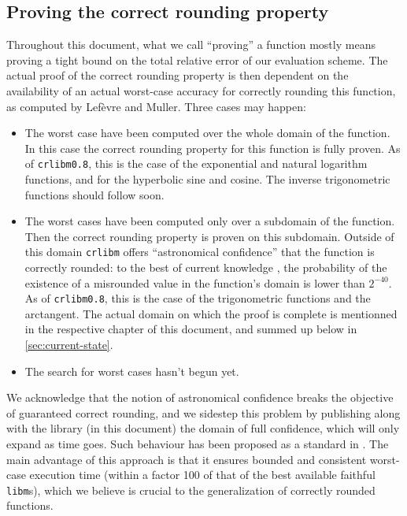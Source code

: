 \subsection{Proving the correct rounding property}

Throughout this document, what we call ``proving'' a function mostly
means proving a tight bound on the total relative error of our
evaluation scheme. The actual proof of the correct rounding property
is then dependent on the availability of an actual worst-case accuracy
for correctly rounding this function, as computed by Lef\`evre and
Muller. Three cases may happen:
\begin{itemize}
\item The worst case have been computed over the whole domain of the
  function. In this case the correct rounding property for this
  function is fully proven. As of \texttt{crlibm0.8}, this is the case
  of the exponential and natural logarithm functions, and for the
  hyperbolic sine and cosine. The inverse trigonometric functions
  should follow soon.

\item The worst cases have been computed only over a subdomain of the
  function. Then the correct rounding property is proven on this
  subdomain. Outside of this domain \texttt{crlibm} offers
  ``astronomical confidence'' that the function is correctly rounded:
  to the best of current knowledge \cite{Gal86, DinGast2005}, the
  probability of the existence of a misrounded value in the function's
  domain is lower than $2^{-40}$. As of \texttt{crlibm0.8}, this is
  the case of the trigonometric functions and the arctangent. The
  actual domain on which the proof is complete is mentionned in the
  respective chapter of this document, and summed up below in \ref{sec:current-state}.
\item The search for worst cases hasn't begun yet.
\end{itemize}

We acknowledge that the notion of astronomical confidence breaks the
objective of guaranteed correct rounding, and we sidestep this problem
by publishing along with the library (in this document) the domain of
full confidence, which will only expand as time goes.  Such behaviour
has been proposed as a standard in \cite{DefHanLefMulRevZim2004}.  The
main advantage of this approach is that it ensures bounded and
consistent worst-case execution time (within a factor 100 of that of
the best available faithful \texttt{libm}s), which we believe is
crucial to the generalization of correctly rounded functions.

